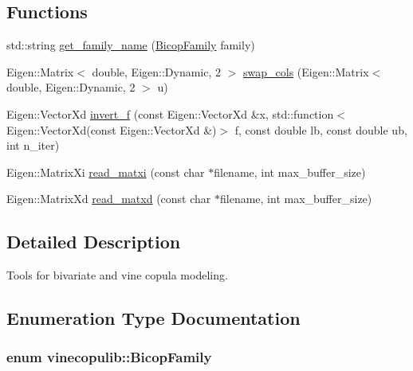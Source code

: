 \subsection*{Functions}
\begin{DoxyCompactItemize}
\item 
std\+::string \hyperlink{namespacevinecopulib_ac46553ae5f99072f65e9d3254d2c526d}{get\+\_\+family\+\_\+name} (\hyperlink{namespacevinecopulib_a42e95cc06d33896199caab0c11ad44f3}{Bicop\+Family} family)
\item 
Eigen\+::\+Matrix$<$ double, Eigen\+::\+Dynamic, 2 $>$ \hyperlink{namespacevinecopulib_aa3421ad64bd8f7e65a9e40d7cc535c47}{swap\+\_\+cols} (Eigen\+::\+Matrix$<$ double, Eigen\+::\+Dynamic, 2 $>$ u)
\item 
Eigen\+::\+Vector\+Xd \hyperlink{namespacevinecopulib_a361de9f49aaa931c1942cd8d76818486}{invert\+\_\+f} (const Eigen\+::\+Vector\+Xd \&x, std\+::function$<$ Eigen\+::\+Vector\+Xd(const Eigen\+::\+Vector\+Xd \&)$>$ f, const double lb, const double ub, int n\+\_\+iter)
\item 
Eigen\+::\+Matrix\+Xi \hyperlink{namespacevinecopulib_a7c8538807c0c4f07ed8dd3e0c8aab5f6}{read\+\_\+matxi} (const char $\ast$filename, int max\+\_\+buffer\+\_\+size)
\item 
Eigen\+::\+Matrix\+Xd \hyperlink{namespacevinecopulib_a878dd05685496911a31657a23267cd8e}{read\+\_\+matxd} (const char $\ast$filename, int max\+\_\+buffer\+\_\+size)
\end{DoxyCompactItemize}


\subsection{Detailed Description}
Tools for bivariate and vine copula modeling. 

\subsection{Enumeration Type Documentation}
\subsubsection[{\texorpdfstring{Bicop\+Family}{BicopFamily}}]{\setlength{\rightskip}{0pt plus 5cm}enum {\bf vinecopulib\+::\+Bicop\+Family}\hspace{0.3cm}{\ttfamily [strong]}}\hypertarget{namespacevinecopulib_a42e95cc06d33896199caab0c11ad44f3}{}\label{namespacevinecopulib_a42e95cc06d33896199caab0c11ad44f3}


